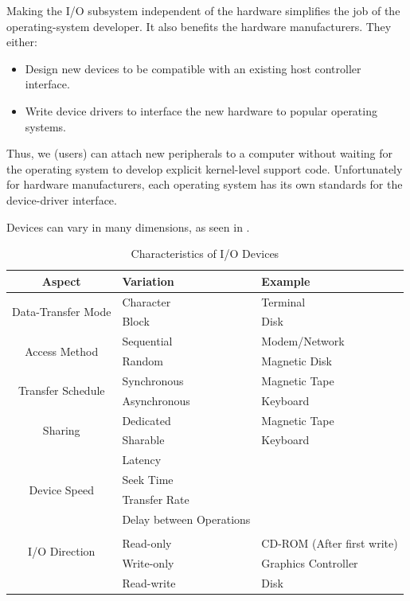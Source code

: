 Making the I/O subsystem independent of the hardware simplifies the job of the operating-system developer.
It also benefits the hardware manufacturers.
They either:
\begin{itemize}[noitemsep]
\item Design new devices to be compatible with an existing host controller interface.
\item Write device drivers to interface the new hardware to popular operating systems.
\end{itemize}

Thus, we (users) can attach new peripherals to a computer without waiting for the operating system to develop explicit kernel-level support code.
Unfortunately for hardware manufacturers, each operating system has its own standards for the device-driver interface.

Devices can vary in many dimensions, as seen in .
\begin{table}[h!tbp]
  \centering
  \begin{tabular}{cll}
    \toprule
    \textbf{Aspect} & \textbf{Variation} & \textbf{Example} \\
    \midrule
    \multirow{2}{*}{Data-Transfer Mode} & Character & Terminal \\
                    & Block & Disk \\
    \multirow{2}{*}{Access Method} & Sequential & Modem/Network \\
                    & Random & Magnetic Disk \\
    \multirow{2}{*}{Transfer Schedule} & Synchronous & Magnetic Tape \\
                    & Asynchronous & Keyboard \\
    \multirow{2}{*}{Sharing} & Dedicated & Magnetic Tape \\
                    & Sharable & Keyboard \\
    \multirow{4}{*}{Device Speed} & Latency & \\
                    & Seek Time & \\
                    & Transfer Rate & \\
                    & Delay between Operations & \\
    \multirow{3}{*}{I/O Direction} & & \\
                    & Read-only & CD-ROM (After first write) \\
                    & Write-only & Graphics Controller \\
                    & Read-write & Disk \\
    \bottomrule
  \end{tabular}
  \caption{Characteristics of I/O Devices}
  \label{tab:Characteristics_IO_Devices}
\end{table}

